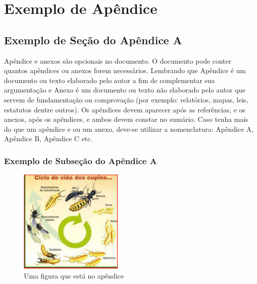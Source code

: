 \chapter{Exemplo de Ap\^{e}ndice}

\section{Exemplo de Seção do Ap\^{e}ndice A}

Apêndice e anexos são opcionais no documento. O documento pode conter quantos apêndices ou anexos forem necessários. Lembrando que Apêndice é um documento ou texto elaborado pelo autor a fim de complementar sua argumentação e Anexo é um documento ou texto não elaborado pelo autor que servem de fundamentação ou comprovação (por exemplo: relatórios, mapas, leis, estatutos dentre outros). Os apêndices devem aparecer após as referências, e os anexos, após os apêndices, e ambos devem constar no sumário.
Caso tenha mais do que um apêndice e ou um anexo, deve-se utilizar a nomenclatura: Apêndice A, Apêndice B, Apêndice C etc.

\subsection{Exemplo de Subseção do Ap\^{e}ndice A}

\begin{figure}[h]
    \centering
    \includegraphics[height=5cm, width=5cm]{texts/ape1/figs/pragas_ciclo_cupim}
    \caption{Uma figura que está no apêndice}\label{FD}
\end{figure}
